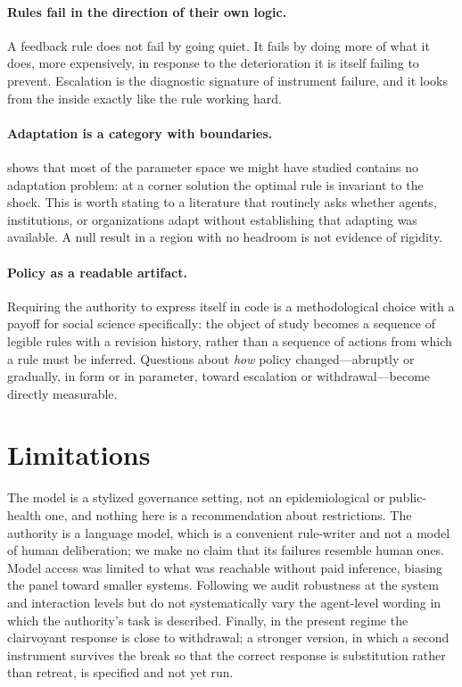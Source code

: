 \documentclass[11pt]{article}
\begin{document}
\paragraph{Rules fail in the direction of their own logic.} A feedback rule does not fail by going
quiet. It fails by doing more of what it does, more expensively, in response to the deterioration it
is itself failing to prevent. Escalation is the diagnostic signature of instrument failure, and it
looks from the inside exactly like the rule working hard.

\paragraph{Adaptation is a category with boundaries.}  shows that most of the
parameter space we might have studied contains no adaptation problem: at a corner solution the
optimal rule is invariant to the shock. This is worth stating to a literature that routinely asks
whether agents, institutions, or organizations adapt without establishing that adapting was
available. A null result in a region with no headroom is not evidence of rigidity.

\paragraph{Policy as a readable artifact.} Requiring the authority to express itself in code is a
methodological choice with a payoff for social science specifically: the object of study becomes a
sequence of legible rules with a revision history, rather than a sequence of actions from which a
rule must be inferred. Questions about \emph{how} policy changed---abruptly or gradually, in form or
in parameter, toward escalation or withdrawal---become directly measurable.

\section{Limitations}

The model is a stylized governance setting, not an epidemiological or public-health one, and nothing
here is a recommendation about restrictions. The authority is a language model, which is a
convenient rule-writer and not a model of human deliberation; we make no claim that its failures
resemble human ones. Model access was limited to what was reachable without paid inference, biasing
the panel toward smaller systems. Following \citet{ye2026trails} we audit robustness at the system
and interaction levels but do not systematically vary the agent-level wording in which the
authority's task is described. Finally, in the present regime the clairvoyant response is close to withdrawal;
a stronger version, in which a second instrument survives the break so that the correct response is
substitution rather than retreat, is specified and not yet run.
\end{document}
